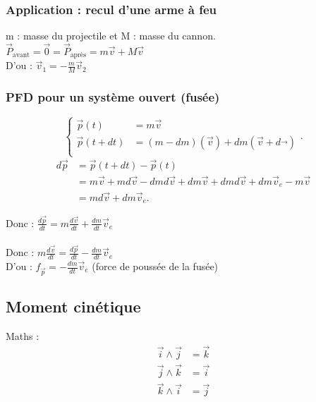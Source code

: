 \documentclass{article}
\begin{document}
\subsubsection{Application : recul d'une arme à feu}

m : masse du projectile et M : masse du cannon.\\
\(\vec{P}_{\text{avant}} = \vec{0} = \vec{P}_{\text{après}} = m\vec{v} + M\vec{v}\) \\
D'ou : \(\vec{v}_1 = -\frac{m}{M}\vec{v}_2\)

\subsubsection{PFD pour un système ouvert (fusée)}


\[
\begin{cases}
    \vec{p}(t) &= m\vec{v}  \\
    \vec{p}(t+dt)&= (m-dm)(\vec{v}) + dm(\vec{v}+d\vec{}) \\
\end{cases}
.\] 
\begin{align*}
    d\vec{p} &= \vec{p}(t+dt) -\vec{p}(t) \\
    &= m\vec{v} + md\vec{v} -dmd\vec{v} + dm\vec{v} + dmd\vec{v} + dm\vec{v}_e - m\vec{v} \\
    &= md\vec{v} + dm\vec{v}_e
.\end{align*}

Donc : \( \frac{d\vec{p}}{dt} = m\frac{d\vec{v}}{dt} + \frac{dm}{dt} \vec{v}_e \) \\ \\
Donc : \(m \frac{d\vec{v}}{dt} = \frac{d\vec{p}}{dt} - \frac{dm}{dt} \vec{v}_e \)\\

D'ou : \(f_{\vec{p}} = -\frac{dm}{dt}\vec{v}_e\) (force de poussée de la fusée)
\subsection{Moment cinétique}

Maths : 
\begin{align*}
    \vec{i} \wedge \vec{j} &= \vec{k} \\
    \vec{j} \wedge \vec{k} &= \vec{i} \\
    \vec{k} \wedge \vec{i} &= \vec{j} \\
\end{align*}
\end{document}
